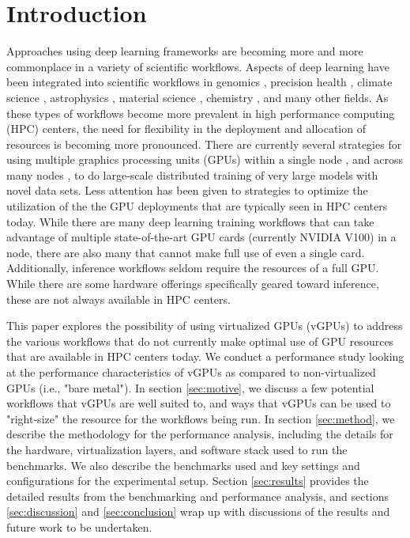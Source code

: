 \documentclass[acmsmall, authorversion]{acmart}
\begin{document}


%
\maketitle

\section{Introduction}
Approaches using deep learning frameworks are becoming more and more commonplace in a variety of scientific workflows. Aspects of deep learning have been integrated into scientific workflows in genomics \cite{genomics}, precision health \cite{prec-health}, climate science \cite{climate}, astrophysics \cite{astro}, material science \cite{material-science}, chemistry \cite{chemistry}, and many other fields. As these types of workflows become more prevalent in high performance computing (HPC) centers, the need for flexibility in the deployment and allocation of resources is becoming more pronounced. There are currently several strategies for using multiple graphics processing units (GPUs) within a single node \cite{mg-sn-1, mg-sn-2}, and across many nodes \cite{mg-mn-1, mg-mn-2}, to do large-scale distributed training of very large models with novel data sets. Less attention has been given to strategies to optimize the utilization of the the GPU deployments that are typically seen in HPC centers today. While there are many deep learning training workflows that can take advantage of multiple state-of-the-art GPU cards (currently NVIDIA V100) in a node, there are also many that cannot make full use of even a single card. Additionally, inference workflows seldom require the resources of a full GPU. While there are some hardware offerings specifically geared toward inference, these are not always available in HPC centers.

This paper explores the possibility of using virtualized GPUs (vGPUs) to address the various workflows that do not currently make optimal use of GPU resources that are available in HPC centers today. We conduct a performance study looking at the performance characteristics of vGPUs as compared to non-virtualized GPUs (i.e., "bare metal"). In section \ref{sec:motive}, we discuss a few potential workflows that vGPUs are well suited to, and ways that vGPUs can be used to "right-size" the resource for the workflows being run. In section \ref{sec:method}, we describe the methodology for the performance analysis, including the details for the hardware, virtualization layers, and software stack used to run the benchmarks. We also describe the benchmarks used and key settings and configurations for the experimental setup. Section \ref{sec:results} provides the detailed results from the benchmarking and performance analysis, and sections \ref{sec:discussion} and \ref{sec:conclusion} wrap up with discussions of the results and future work to be undertaken.
\end{document}
